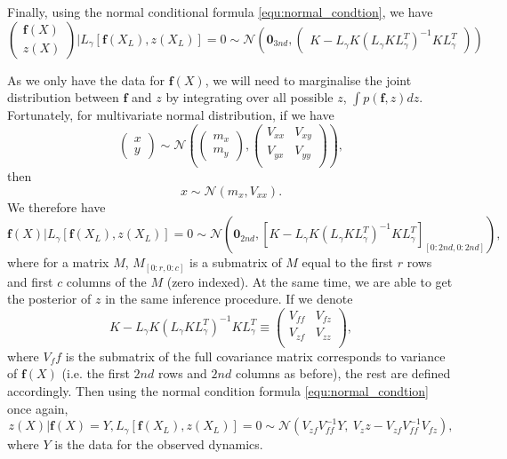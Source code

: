 \documentclass{statsmsc}
\begin{document}
Finally, using the normal conditional formula \ref{equ:normal_condtion}, we have 
\begin{equation}
  \begin{pmatrix}\mathbf{f}(X) \\ z(X) \end{pmatrix}|L_\gamma[\mathbf{f}(X_L), z(X_L)]=0 \sim \mathcal{N} \left(\mathbf{0}_{3nd}, \begin{pmatrix}
    K-L_\gamma K(L_\gamma KL_\gamma^T)^{-1}KL_\gamma^T
  \end{pmatrix}\right)
  \label{equ:invariance_condition_withZ}
\end{equation}

As we only have the data for $\mathbf{f}(X)$, we will need to marginalise the joint distribution between $\mathbf{f}$ and $z$ by integrating over all possible $z$, $\int p(\mathbf{f},z) dz$.
Fortunately, for multivariate normal distribution, if we have
$$
\begin{pmatrix}
  x \\ y
\end{pmatrix}
\sim\mathcal{N}
\left(
  \begin{pmatrix}
    m_x \\ m_y 
  \end{pmatrix},
\begin{pmatrix}
  V_{xx} & V_{xy} \\ V_{yx} & V_{yy} \\
\end{pmatrix}
\right),
$$
then 
$$
x\sim\mathcal{N}(m_x, V_{xx}).
$$
We therefore have 
$$
\mathbf{f}(X)|L_\gamma[\mathbf{f}(X_L), z(X_L)]=0 \sim \mathcal{N}(\mathbf{0}_{2nd}, [K-L_\gamma K(L_\gamma KL_\gamma^T)^{-1}KL_\gamma^T]_{[0:2nd, 0:2nd]}),
$$
where for a matrix $M$, $M_{[0:r,0:c]}$ is a submatrix of $M$ equal to the first $r$ rows and first $c$ columns of the $M$ (zero indexed).
At the same time, we are able to get the posterior of $z$ in the same inference procedure. 
If we denote 
$$
K-L_\gamma K(L_\gamma KL_\gamma^T)^{-1}KL_\gamma^T \equiv \begin{pmatrix}
  V_{ff} & V_{fz} \\ V_{zf} & V_{zz} \\
\end{pmatrix},
$$
where $V_ff$ is the submatrix of the full covariance matrix corresponds to variance of $\mathbf{f}(X)$ (i.e. the first $2nd$ rows and $2nd$ columns as before), the rest are defined accordingly.  
Then using the normal condition formula \ref{equ:normal_condtion} once again, 
$$
z(X)|\mathbf{f}(X)=Y, L_\gamma[\mathbf{f}(X_L), z(X_L)]=0
\sim\mathcal{N}
(V_{zf}V_{ff}^{-1}Y,\ V_zz-V_{zf}V_{ff}^{-1}V_{fz}),
$$
where $Y$ is the data for the observed dynamics.
\end{document}

